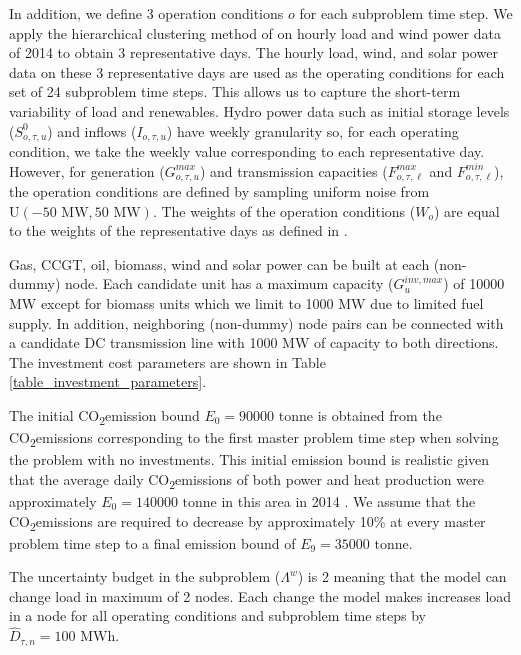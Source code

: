 \documentclass[final]{IEEEtran}
\newcommand{\COtwo}{CO\textsubscript{2}\;}
\begin{document}
In addition, we define 3 operation conditions $o$ for each subproblem time step. We apply the hierarchical clustering method of \cite{Nahmmacher} on hourly load and wind power data of 2014 to obtain 3 representative days. The hourly load, wind, and solar power data on these 3 representative days are used as the operating conditions for each set of 24 subproblem time steps. This allows us to capture the short-term variability of load and renewables. Hydro power data such as initial storage levels ($S_{o, \tau, u}^0$) and inflows ($I_{o, \tau, u}$) have weekly granularity so, for each operating condition, we take the weekly value corresponding to each representative day. However, for generation ($G^{max}_{o, \tau, u}$) and transmission capacities ($F^{max}_{o, \tau, \ell}$ and $F^{min}_{o, \tau, \ell}$), the operation conditions are defined by sampling uniform noise from $\textrm{U}(-50 \textrm{ MW}, 50 \textrm{ MW})$. The weights of the operation conditions ($W_o$) are equal to the weights of the representative days as defined in \cite{Nahmmacher}.

Gas, CCGT, oil, biomass, wind and solar power can be built at each (non-dummy) node. Each candidate unit has a maximum capacity ($G^{inv,max}_u$) of 10000 MW except for biomass units which we limit to 1000 MW due to limited fuel supply. In addition, neighboring (non-dummy) node pairs can be connected with a candidate DC transmission line with 1000 MW of capacity to both directions. The investment cost parameters are shown in Table \ref{table_investment_parameters}.

The initial \COtwo emission bound $E_{0} = 90000 \textrm{ tonne}$ is obtained from the \COtwo emissions corresponding to the first master problem time step when solving the problem with no investments. This initial emission bound is realistic given that the average daily \COtwo emissions of both power and heat production were approximately $E_{0} = 140000 \textrm{ tonne}$ in this area in 2014 \cite{EEA_COtwo}. We assume that the \COtwo emissions are required to decrease by approximately 10\% at every master problem time step to a final emission bound of $E_{9} = 35000 \textrm{ tonne}$.

The uncertainty budget in the subproblem ($\Lambda^w$) is 2 meaning that the model can change load in maximum of 2 nodes. Each change the model makes increases load in a node for all operating conditions and subproblem time steps by $\hat{D}_{\tau, n} = 100 \textrm{ MWh}$.
\end{document}
